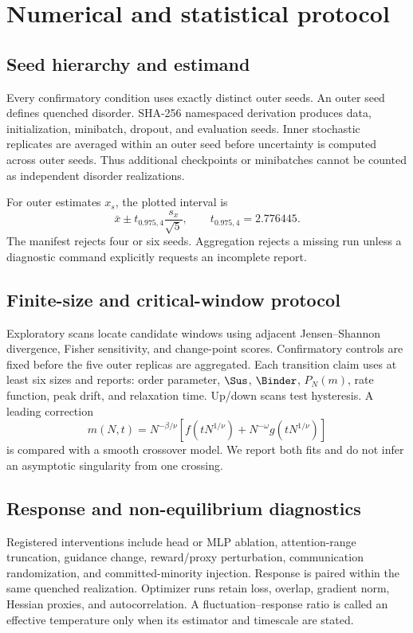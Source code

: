 \section{Numerical and statistical protocol}

\subsection{Seed hierarchy and estimand}

Every confirmatory condition uses exactly \NSeeds{} distinct outer seeds. An outer seed
defines quenched disorder. SHA-256 namespaced derivation produces data, initialization,
minibatch, dropout, and evaluation seeds. Inner stochastic replicates are averaged within
an outer seed before uncertainty is computed across outer seeds. Thus additional
checkpoints or minibatches cannot be counted as independent disorder realizations.

For outer estimates \(x_s\), the plotted interval is
\[
 \bar x \pm t_{0.975,4}\frac{s_x}{\sqrt{5}},\qquad t_{0.975,4}=2.776445.
\]
The manifest rejects four or six seeds. Aggregation rejects a missing run unless a
diagnostic command explicitly requests an incomplete report.

\subsection{Finite-size and critical-window protocol}

Exploratory scans locate candidate windows using adjacent Jensen--Shannon divergence,
Fisher sensitivity, and change-point scores. Confirmatory controls are fixed before the
five outer replicas are aggregated. Each transition claim uses at least six sizes and
reports: order parameter, \(\Sus\), \(\Binder\), \(P_N(m)\), rate function, peak drift,
and relaxation time. Up/down scans test hysteresis. A leading correction
\[
  m(N,t)=N^{-\beta/\nu}
  \left[f(tN^{1/\nu})+N^{-\omega}g(tN^{1/\nu})\right]
\]
is compared with a smooth crossover model. We report both fits and do not infer an
asymptotic singularity from one crossing.

\subsection{Response and non-equilibrium diagnostics}

Registered interventions include head or MLP ablation, attention-range truncation, guidance
change, reward/proxy perturbation, communication randomization, and committed-minority
injection. Response is paired within the same quenched realization. Optimizer runs retain
loss, overlap, gradient norm, Hessian proxies, and autocorrelation. A fluctuation--response
ratio is called an effective temperature only when its estimator and timescale are stated.

